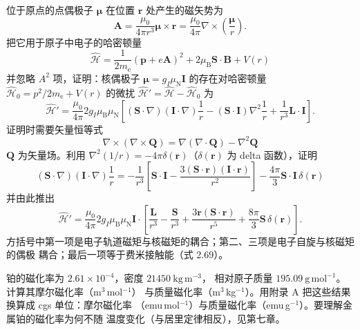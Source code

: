  位于原点的点偶极子 $\boldsymbol{\mu}$ 在位置 $\mathbf{r}$ 处产生的磁矢势为
\begin{equation*}
\mathbf{A} = \frac{\mu_0}{4\pi r^{3}}\boldsymbol{\mu}\times\mathbf{r} = \frac{\mu_0}{4\pi}\nabla\times\left(\frac{\boldsymbol{\mu}}{r}\right).\tag{2.85}
\end{equation*}
把它用于原子中电子的哈密顿量
\begin{equation*}
\hat{\mathcal{H}} = \frac{1}{2m_{\mathrm{e}}}(\mathbf{p}+e\mathbf{A})^{2} + 2\mu_{\mathrm{B}}\mathbf{S}\cdot\mathbf{B} + V(r)\tag{2.86}
\end{equation*}
并忽略 $A^{2}$ 项，证明：核偶极子 $\boldsymbol{\mu}=g_I\mu_{\mathrm{N}}\mathbf{I}$
的存在对哈密顿量 $\hat{\mathcal{H}}_0=p^{2}/2m_{\mathrm{e}}+V(r)$ 的微扰
$\hat{\mathcal{H}}'=\hat{\mathcal{H}}-\hat{\mathcal{H}}_0$ 为
\begin{equation*}
\hat{\mathcal{H}}' = \frac{\mu_0}{4\pi}2g_I\mu_{\mathrm{B}}\mu_{\mathrm{N}}\left[(\mathbf{S}\cdot\nabla)(\mathbf{I}\cdot\nabla)\frac{1}{r} - (\mathbf{S}\cdot\mathbf{I})\nabla^{2}\frac{1}{r} + \frac{1}{r^{3}}\mathbf{L}\cdot\mathbf{I}\right].\tag{2.87}
\end{equation*}
证明时需要矢量恒等式
\begin{equation*}
\nabla\times(\nabla\times\mathbf{Q}) = \nabla(\nabla\cdot\mathbf{Q}) - \nabla^{2}\mathbf{Q}\tag{2.88}
\end{equation*}
$\mathbf{Q}$ 为矢量场。利用 $\nabla^{2}(1/r)=-4\pi\delta(\mathbf{r})$（$\delta(\mathbf{r})$
为 delta 函数），证明
\begin{equation*}
(\mathbf{S}\cdot\nabla)(\mathbf{I}\cdot\nabla)\frac{1}{r} = -\frac{1}{r^{3}}\left[\mathbf{S}\cdot\mathbf{I} - \frac{3(\mathbf{S}\cdot\mathbf{r})(\mathbf{I}\cdot\mathbf{r})}{r^{2}}\right] - \frac{4\pi}{3}\mathbf{S}\cdot\mathbf{I}\,\delta(\mathbf{r})\tag{2.89}
\end{equation*}
并由此推出
\begin{equation*}
\hat{\mathcal{H}}' = \frac{\mu_0}{4\pi}2g_I\mu_{\mathrm{B}}\mu_{\mathrm{N}}\mathbf{I}\cdot\left[\frac{\mathbf{L}}{r^{3}} - \frac{\mathbf{S}}{r^{3}} + \frac{3\mathbf{r}(\mathbf{S}\cdot\mathbf{r})}{r^{5}} + \frac{8\pi}{3}\mathbf{S}\,\delta(\mathbf{r})\right].\tag{2.90}
\end{equation*}
方括号中第一项是电子轨道磁矩与核磁矩的耦合；第二、三项是电子自旋与核磁矩的偶极
耦合；最后一项等于费米接触能（式 2.69）。

 铂的磁化率为 $2.61\times10^{-4}$，密度 $21450\ \mathrm{kg\,m^{-3}}$，
相对原子质量 $195.09\ \mathrm{g\,mol^{-1}}$。计算其摩尔磁化率（m$^3$\,mol$^{-1}$）
与质量磁化率（m$^3$\,kg$^{-1}$）。用附录 A 把这些结果换算成 cgs 单位：摩尔磁化率
（emu\,mol$^{-1}$）与质量磁化率（emu\,g$^{-1}$）。要理解金属铂的磁化率为何不随
温度变化（与居里定律相反），见第七章。

